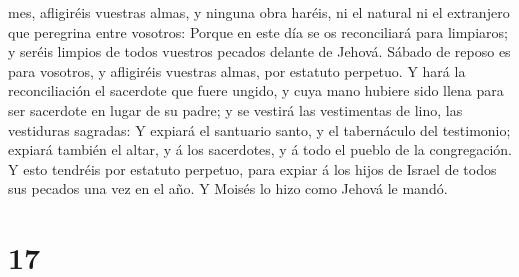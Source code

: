 mes, afligiréis vuestras almas, y ninguna obra haréis, ni el natural ni
el extranjero que peregrina entre vosotros:  Porque en
este día se os reconciliará para limpiaros; y seréis limpios de todos
vuestros pecados delante de Jehová.  Sábado de reposo es
para vosotros, y afligiréis vuestras almas, por estatuto perpetuo.
 Y hará la reconciliación el sacerdote que fuere ungido,
y cuya mano hubiere sido llena para ser sacerdote en lugar de su padre;
y se vestirá las vestimentas de lino, las vestiduras sagradas:
 Y expiará el santuario santo, y el tabernáculo del
testimonio; expiará también el altar, y á los sacerdotes, y á todo el
pueblo de la congregación.  Y esto tendréis por estatuto
perpetuo, para expiar á los hijos de Israel de todos sus pecados una vez
en el año. Y Moisés lo hizo como Jehová le mandó.

\hypertarget{section-16}{%
\section{17}\label{section-16}}

